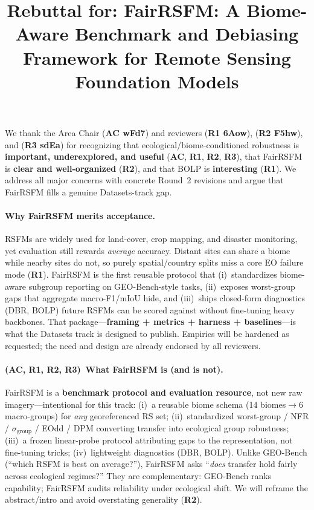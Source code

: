 \documentclass[10pt,twocolumn,letterpaper]{article}
\newcommand{\Rone}{\textcolor{RoneBlue}{\textbf{R1}}}
\newcommand{\Rtwo}{\textcolor{RtwoRed}{\textbf{R2}}}
\newcommand{\Rthree}{\textcolor{RthreeGreen}{\textbf{R3}}}
\newcommand{\AC}{\textcolor{ACPurple}{\textbf{AC}}}
\begin{document}
\title{Rebuttal for: FairRSFM: A Biome-Aware Benchmark and Debiasing Framework for Remote Sensing Foundation Models}
\maketitle
\thispagestyle{empty}
\appendix

{\footnotesize
We thank the Area Chair (\textcolor{ACPurple}{\textbf{AC wFd7}}) and reviewers
\textcolor{RoneBlue}{(\textbf{R1 6Aow})},
\textcolor{RtwoRed}{(\textbf{R2 F5hw})}, and
\textcolor{RthreeGreen}{(\textbf{R3 sdEa})}
for recognizing that ecological/biome-conditioned robustness is \textbf{important, underexplored, and useful} (\AC, \Rone, \Rtwo, \Rthree), that FairRSFM is \textbf{clear and well-organized} (\Rtwo), and that BOLP is \textbf{interesting} (\Rone). We address all major concerns with concrete Round~2 revisions and argue that FairRSFM fills a genuine Datasets-track gap.

\vspace{-0.28em}
\paragraph{Why FairRSFM merits acceptance.}
RSFMs are widely used for land-cover, crop mapping, and disaster monitoring, yet evaluation still rewards \emph{average} accuracy. Distant sites can share a biome while nearby sites do not, so purely spatial/country splits miss a core EO failure mode (\Rone). FairRSFM is the first reusable protocol that (i)~standardizes biome-aware subgroup reporting on GEO-Bench-style tasks, (ii)~exposes worst-group gaps that aggregate macro-F1/mIoU hide, and (iii)~ships closed-form diagnostics (DBR, BOLP) future RSFMs can be scored against without fine-tuning heavy backbones. That package---\textbf{framing + metrics + harness + baselines}---is what the Datasets track is designed to publish. Empirics will be hardened as requested; the need and design are already endorsed by all reviewers.

\vspace{-0.28em}
\paragraph{(\AC, \Rone, \Rtwo, \Rthree)\, What FairRSFM is (and is not).}
FairRSFM is a \textbf{benchmark protocol and evaluation resource}, not new raw imagery---intentional for this track: (i)~a reusable biome schema (14 biomes$\to$6 macro-groups) for \emph{any} georeferenced RS set; (ii)~standardized worst-group / NFR / $\sigma_{\mathrm{group}}$ / EOdd / DPM converting transfer into ecological group robustness; (iii)~a frozen linear-probe protocol attributing gaps to the representation, not fine-tuning tricks; (iv)~lightweight diagnostics (DBR, BOLP). Unlike GEO-Bench (``which RSFM is best on average?''), FairRSFM asks ``\emph{does} transfer hold fairly across ecological regimes?'' They are complementary: GEO-Bench ranks capability; FairRSFM audits reliability under ecological shift. We will reframe the abstract/intro and avoid overstating generality (\Rtwo).

}
\end{document}
